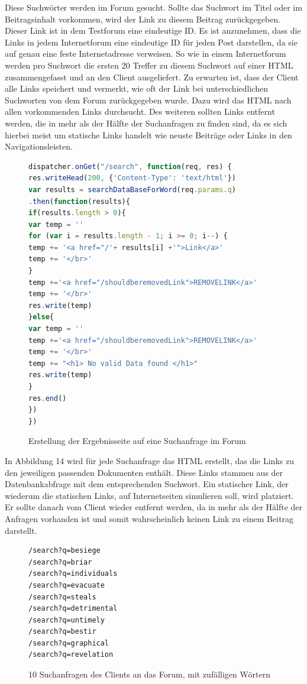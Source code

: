Diese Suchwörter werden im Forum gesucht. Sollte das Suchwort im Titel oder im Beitragsinhalt vorkommen, wird der Link zu diesem Beitrag zurückgegeben. Dieser Link ist in dem Testforum eine eindeutige ID. Es ist anzunehmen, dass die Links in jedem Internetforum eine eindeutige ID für jeden Post darstellen, da sie auf genau eine feste Internetadresse verweisen. So wie in einem Internetforum werden pro Suchwort die ersten 20 Treffer zu diesem Suchwort auf einer HTML zusammengefasst und an den Client ausgeliefert. Zu erwarten ist, dass der Client alle Links speichert und vermerkt, wie oft der Link bei unterschiedlichen Suchworten von dem Forum zurückgegeben wurde. Dazu wird das HTML nach allen vorkommenden Links durchsucht. Des weiteren sollten Links entfernt werden, die in mehr als der Hälfte der Suchanfragen zu finden sind, da es sich hierbei meist um statische Links handelt wie neuste Beiträge oder Links in den Navigationsleisten.
\newpage

\begin{figure}[h!]
\begin{lstlisting}[language=JavaScript]
dispatcher.onGet("/search", function(req, res) {
res.writeHead(200, {'Content-Type': 'text/html'})
var results = searchDataBaseForWord(req.params.q)
.then(function(results){
if(results.length > 0){
var temp = ''
for (var i = results.length - 1; i >= 0; i--) {
temp += '<a href="/'+ results[i] +'">Link</a>'
temp += '</br>'
}
temp +='<a href="/shouldberemovedLink">REMOVELINK</a>'
temp += '</br>'
res.write(temp)
}else{
var temp = ''
temp +='<a href="/shouldberemovedLink">REMOVELINK</a>'
temp += '</br>'
temp += "<h1> No valid Data found </h1>"
res.write(temp)
}
res.end() 
}) 
})
\end{lstlisting}
\caption{Erstellung der Ergebnisseite auf eine Suchanfrage im Forum}
\end{figure}

In Abbildung 14 wird für jede Suchanfrage das HTML erstellt, das die Links zu den jeweiligen passenden Dokumenten enthält. Diese Links stammen aus der Datenbankabfrage mit dem entsprechenden Suchwort.
Ein statischer Link, der wiederum die statischen Links, auf Internetseiten simulieren soll, wird platziert. Er sollte danach vom Client wieder entfernt werden, da in mehr als der Hälfte der Anfragen vorhanden ist und somit wahrscheinlich keinen Link zu einem Beitrag darstellt.

\begin{figure}[h!]
\begin{lstlisting}[language=HTML5]
/search?q=besiege
/search?q=briar
/search?q=individuals
/search?q=evacuate
/search?q=steals
/search?q=detrimental
/search?q=untimely
/search?q=bestir
/search?q=graphical
/search?q=revelation
\end{lstlisting}
\caption{10 Suchanfragen des Clients an das Forum, mit zufälligen Wörtern}
\end{figure}

